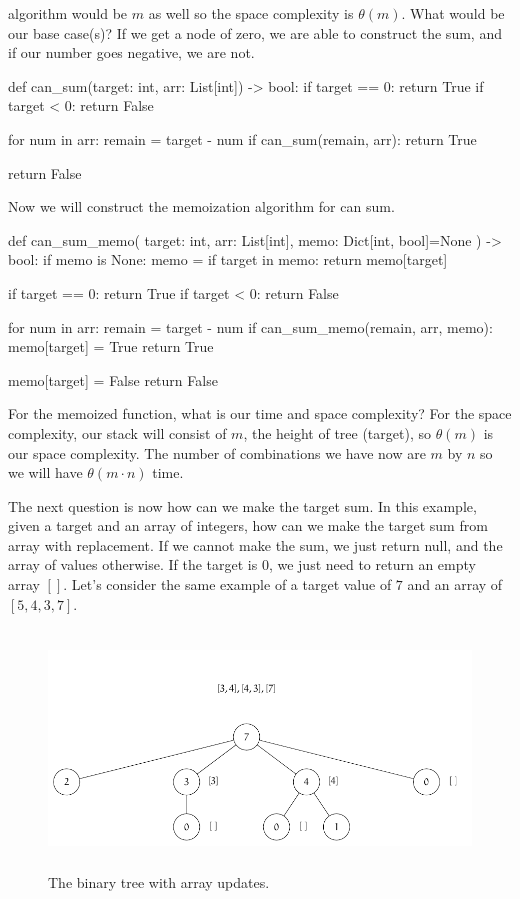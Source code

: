 \documentclass[12pt,dvipsnames,svgnames,x11names]{article}
\begin{document}
algorithm would be \(m\) as well so the space complexity is \(\theta (m)\). What would be our base 
case(s)? If we get a node of zero, we are able to construct the sum, and if our number goes negative,
we are not.
\begin{python}
def can_sum(target: int, arr: List[int]) -> bool:
  if target == 0:
    return True
  if target < 0:
    return False
    
  for num in arr:
    remain = target - num
    if can_sum(remain, arr):
      return True
      
  return False
\end{python}
\par\medskip
Now we will construct the memoization algorithm for can sum.
\begin{python}
def can_sum_memo(
    target: int, 
    arr: List[int], 
    memo: Dict[int, bool]=None
    ) -> bool:
  if memo is None:
    memo = {}
  if target in memo:
    return memo[target]
    
  if target == 0:
    return True
  if target < 0:
    return False
    
  for num in arr:
    remain = target - num
    if can_sum_memo(remain, arr, memo):
      memo[target] = True
      return True
      
  memo[target] = False
  return False
\end{python}
For the memoized function, what is our time and space complexity? For the space complexity, our
stack will consist of \(m\), the height of tree (target), so \(\theta (m)\) is our space complexity. The number
of combinations we have now are \(m\) by \(n\) so we will have \(\theta (m\cdot n)\) time.
\par\medskip
The next question is now how can we make the target sum. In this example, given a target and an array
of integers, how can we make the target sum from array with replacement. If we cannot make the sum,
we just return null, and the array of values otherwise. If the target is \(0\), we just need to return an
empty array \([]\). Let's consider the same example of a target value of \(7\) and an array of 
\([5, 4, 3, 7]\).
\begin{figure}[h]
	\centering
	\includegraphics[height=2.5in]{how_sum.pdf}
	\caption{The binary tree with array updates.}
	\label{fig:how_sum}
\end{figure}
\end{document}
